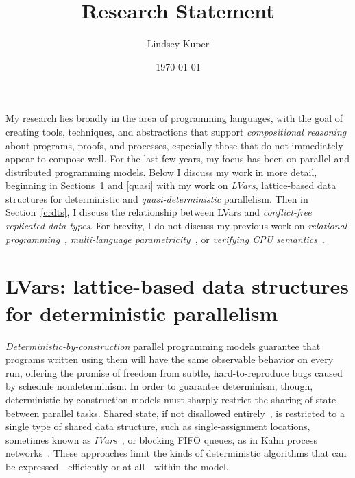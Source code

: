 \documentclass{article}
\begin{document}
\title{Research Statement}

\author{Lindsey Kuper}

\date{\today}

\maketitle


My research lies broadly in the area of programming languages, with
the goal of creating tools, techniques, and abstractions that support
\emph{compositional reasoning} about programs, proofs, and processes,
especially those that do not immediately appear to compose well.  For
the last few years, my focus has been on parallel and distributed
programming models.  Below I discuss my work in more detail, beginning
in Sections~\ref{lvars} and \ref{quasi} with my work on \emph{LVars},
lattice-based data structures for deterministic and
\emph{quasi-deterministic} parallelism.  Then in Section~\ref{crdts}, I discuss
the relationship between LVars and \emph{conflict-free replicated data
  types}.  For brevity, I do not discuss my previous work on
\emph{relational programming}~\cite{lambdae}, \emph{multi-language
  parametricity}~\cite{multilang-talk}, or \emph{verifying CPU
  semantics}~\cite{tsl-tr}.

\section{LVars: lattice-based data structures for deterministic parallelism}\label{lvars}


\emph{Deterministic-by-construction} parallel programming models
guarantee that programs written using them will have the same
observable behavior on every run, offering the promise of freedom from
subtle, hard-to-reproduce bugs caused by schedule nondeterminism.  In
order to guarantee determinism, though, deterministic-by-construction
models must sharply restrict the sharing of state between parallel
tasks.  Shared state, if not disallowed entirely~\cite{dph,
  dpj-oopsla}, is restricted to a single type of shared data
structure, such as single-assignment locations, sometimes known as
\emph{IVars}~\cite{IStructures, CnC}, or blocking FIFO queues, as in
Kahn process networks~\cite{Kahn-1974}.  These approaches limit the
kinds of deterministic algorithms that can be expressed---efficiently
or at all---within the model.
\end{document}
